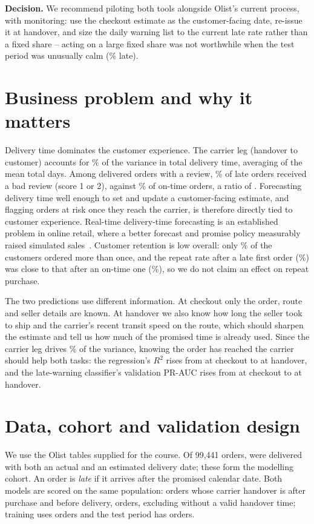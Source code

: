 \documentclass[12pt,a4paper]{article}
\begin{document}
\textbf{Decision.} We recommend piloting both tools alongside Olist's current process, with monitoring: use the checkout estimate as the customer-facing date, re-issue it at handover, and size the daily warning list to the current late rate rather than a fixed share -- acting on a large fixed share was not worthwhile when the test period was unusually calm (\ClsTestLate{}\% late).

\section*{Business problem and why it matters}
Delivery time dominates the customer experience. The carrier leg (handover to customer) accounts for \CarrierShare{}\% of the variance in total delivery time, averaging \CarrierMean{} of the \TotalMean{} mean total days. Among \RatedOrders{} delivered orders with a review, \BadReviewLate{}\% of late orders received a bad review (score 1 or 2), against \BadReviewOnTime{}\% of on-time orders, a ratio of \BadReviewRatio{}. Forecasting delivery time well enough to set and update a customer-facing estimate, and flagging orders at risk once they reach the carrier, is therefore directly tied to customer experience. Real-time delivery-time forecasting is an established problem in online retail, where a better forecast and promise policy measurably raised simulated sales~\cite{salari2022}. Customer retention is low overall: only \RepeatShare{}\% of the \UniqueCustomers{} customers ordered more than once, and the repeat rate after a late first order (\RepeatAfterLate{}\%) was close to that after an on-time one (\RepeatAfterOnTime{}\%), so we do not claim an effect on repeat purchase.

The two predictions use different information. At checkout only the order, route and seller details are known. At handover we also know how long the seller took to ship and the carrier's recent transit speed on the route, which should sharpen the estimate and tell us how much of the promised time is already used. Since the carrier leg drives \CarrierShare{}\% of the variance, knowing the order has reached the carrier should help both tasks: the regression's \(R^2\) rises from \CheckoutSelRSq{} at checkout to \HandoverSelRSq{} at handover, and the late-warning classifier's validation PR-AUC rises from \CheckoutPR{} at checkout to \ValSelPR{} at handover.

\section*{Data, cohort and validation design}
We use the Olist tables supplied for the course. Of 99,441 orders, \AllOrders{} were delivered with both an actual and an estimated delivery date; these form the modelling cohort. An order is \emph{late} if it arrives after the promised calendar date. Both models are scored on the same population: orders whose carrier handover is after purchase and before delivery, \CohortOrders{} orders, excluding \ExcludedOrders{} without a valid handover time; training uses \EtaTrainOrders{} orders and the test period has \EtaTestOrders{} orders.
\end{document}
